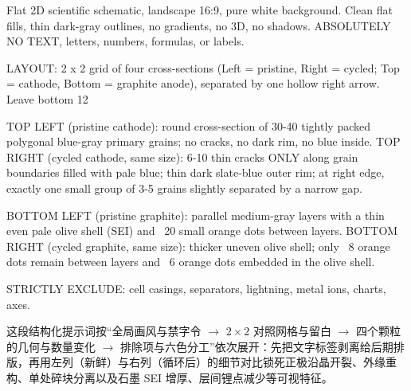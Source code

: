 \begin{Prompt}
Flat 2D scientific schematic, landscape 16:9, pure white background. Clean
flat fills, thin dark-gray outlines, no gradients, no 3D, no shadows.
ABSOLUTELY NO TEXT, letters, numbers, formulas, or labels.

LAYOUT: 2 x 2 grid of four cross-sections (Left = pristine, Right = cycled;
Top = cathode, Bottom = graphite anode), separated by one hollow right arrow.
Leave bottom 12%

TOP LEFT (pristine cathode): round cross-section of 30-40 tightly packed
polygonal blue-gray primary grains; no cracks, no dark rim, no blue inside.
TOP RIGHT (cycled cathode, same size): 6-10 thin cracks ONLY along grain
boundaries filled with pale blue; thin dark slate-blue outer rim; at right
edge, exactly one small group of 3-5 grains slightly separated by a narrow gap.

BOTTOM LEFT (pristine graphite): parallel medium-gray layers with a thin even
pale olive shell (SEI) and ~20 small orange dots between layers.
BOTTOM RIGHT (cycled graphite, same size): thicker uneven olive shell; only ~8
orange dots remain between layers and ~6 orange dots embedded in the olive shell.

STRICTLY EXCLUDE: cell casings, separators, lightning, metal ions, charts, axes.
\end{Prompt}

这段结构化提示词按“全局画风与禁字令 $\rightarrow$ $2\times 2$ 对照网格与留白 $\rightarrow$ 四个颗粒的几何与数量变化 $\rightarrow$ 排除项与六色分工”依次展开：先把文字标签剥离给后期排版，再用左列（新鲜）与右列（循环后）的细节对比锁死正极沿晶开裂、外缘重构、单处碎块分离以及石墨 SEI 增厚、层间锂点减少等可视特征。

